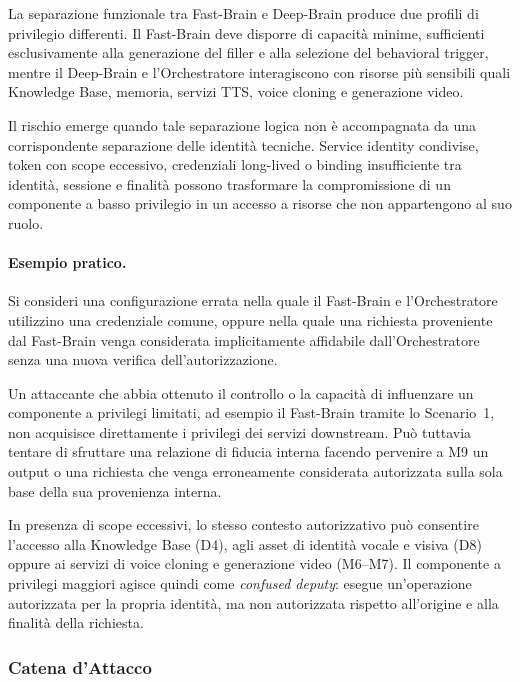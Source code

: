 \documentclass[11pt,a4paper]{article}
\begin{document}
La separazione funzionale tra Fast-Brain e Deep-Brain produce due
profili di privilegio differenti. Il Fast-Brain deve disporre di
capacità minime, sufficienti esclusivamente alla generazione del filler
e alla selezione del behavioral trigger, mentre il Deep-Brain e
l'Orchestratore interagiscono con risorse più sensibili quali Knowledge
Base, memoria, servizi TTS, voice cloning e generazione video.

Il rischio emerge quando tale separazione logica non è accompagnata da
una corrispondente separazione delle identità tecniche. Service identity
condivise, token con scope eccessivo, credenziali long-lived o binding
insufficiente tra identità, sessione e finalità possono trasformare la
compromissione di un componente a basso privilegio in un accesso a
risorse che non appartengono al suo ruolo.

\paragraph{Esempio pratico.}
Si consideri una configurazione errata nella quale il Fast-Brain e
l'Orchestratore utilizzino una credenziale comune, oppure nella quale
una richiesta proveniente dal Fast-Brain venga considerata
implicitamente affidabile dall'Orchestratore senza una nuova verifica
dell'autorizzazione.

Un attaccante che abbia ottenuto il controllo o la capacità di
influenzare un componente a privilegi limitati, ad esempio il
Fast-Brain tramite lo Scenario~1, non acquisisce direttamente i
privilegi dei servizi downstream. Può tuttavia tentare di sfruttare
una relazione di fiducia interna facendo pervenire a M9 un output o
una richiesta che venga erroneamente considerata autorizzata sulla
sola base della sua provenienza interna.

In presenza di scope eccessivi, lo stesso contesto autorizzativo può
consentire l'accesso alla Knowledge Base (D4), agli asset di identità
vocale e visiva (D8) oppure ai servizi di voice cloning e generazione
video (M6--M7). Il componente a privilegi maggiori agisce quindi come
\emph{confused deputy}: esegue un'operazione autorizzata per la propria
identità, ma non autorizzata rispetto all'origine e alla finalità della
richiesta.

\subsubsection{Catena d'Attacco}
\end{document}
